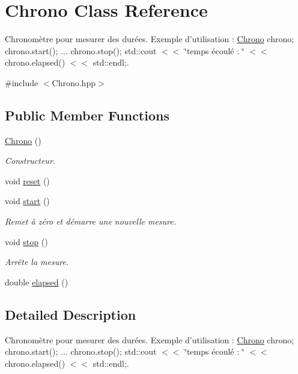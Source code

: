 \hypertarget{classChrono}{\section{Chrono Class Reference}
\label{classChrono}
}


Chronomètre pour mesurer des durées. Exemple d'utilisation \+: \hyperlink{classChrono}{Chrono} chrono; chrono.\+start(); ... chrono.\+stop(); std\+::cout $<$$<$ \char`\"{}temps écoulé \+: \char`\"{} $<$$<$ chrono.\+elapsed() $<$$<$ std\+::endl;.  




{\ttfamily \#include $<$Chrono.\+hpp$>$}

\subsection*{Public Member Functions}
\begin{DoxyCompactItemize}
\item 
\hyperlink{classChrono_a3ac5e047174f389e7bd8aae71c6b5e8c}{Chrono} ()
\begin{DoxyCompactList}\small\item\em Constructeur. \end{DoxyCompactList}\item 
void \hyperlink{classChrono_a027be23720616639bc610a98c53740ea}{reset} ()
\item 
void \hyperlink{classChrono_a25fa21b48125a6a811638aa6b8dcdbe8}{start} ()
\begin{DoxyCompactList}\small\item\em Remet à zéro et démarre une nouvelle mesure. \end{DoxyCompactList}\item 
void \hyperlink{classChrono_a7b8db2281381eac23da35a414077f3fd}{stop} ()
\begin{DoxyCompactList}\small\item\em Arrête la mesure. \end{DoxyCompactList}\item 
double \hyperlink{classChrono_aad4b00919a2eed1271259095a61b3096}{elapsed} ()
\end{DoxyCompactItemize}


\subsection{Detailed Description}
Chronomètre pour mesurer des durées. Exemple d'utilisation \+: \hyperlink{classChrono}{Chrono} chrono; chrono.\+start(); ... chrono.\+stop(); std\+::cout $<$$<$ \char`\"{}temps écoulé \+: \char`\"{} $<$$<$ chrono.\+elapsed() $<$$<$ std\+::endl;. 

